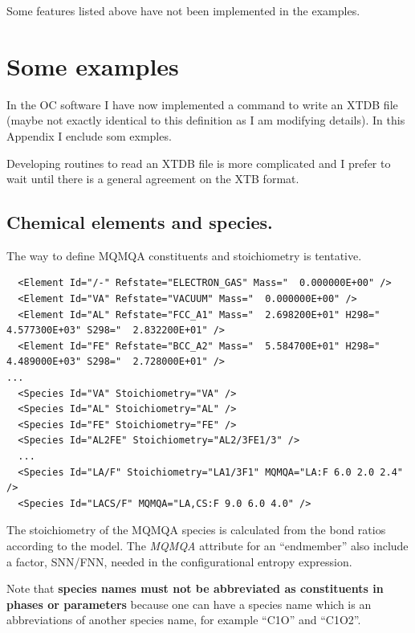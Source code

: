 \documentclass{article}
\begin{document}
\newpage
\begin{appendices}
\setcounter{equation}{0}
\renewcommand{\theequation}{A\arabic{equation}}
\setcounter{figure}{0}
\renewcommand{\thefigure}{A\arabic{figure}}

Some features listed above have not been implemented in the examples.

\section{Some examples}\label{sec:examples}

In the OC software I have now implemented a command to write an XTDB
file (maybe not exactly identical to this definition as I am modifying
details).  In this Appendix I enclude som exmples.

Developing routines to read an XTDB file is more complicated and I
prefer to wait until there is a general agreement on the XTB format.

\subsection{Chemical elements and species.}\label{sec:elementexample}

The way to define MQMQA constituents and stoichiometry is tentative.

{\small
\begin{verbatim}
  <Element Id="/-" Refstate="ELECTRON_GAS" Mass="  0.000000E+00" />
  <Element Id="VA" Refstate="VACUUM" Mass="  0.000000E+00" />
  <Element Id="AL" Refstate="FCC_A1" Mass="  2.698200E+01" H298="  4.577300E+03" S298="  2.832200E+01" />
  <Element Id="FE" Refstate="BCC_A2" Mass="  5.584700E+01" H298="  4.489000E+03" S298="  2.728000E+01" />
...
  <Species Id="VA" Stoichiometry="VA" />
  <Species Id="AL" Stoichiometry="AL" />
  <Species Id="FE" Stoichiometry="FE" />
  <Species Id="AL2FE" Stoichiometry="AL2/3FE1/3" />
  ...
  <Species Id="LA/F" Stoichiometry="LA1/3F1" MQMQA="LA:F 6.0 2.0 2.4" />
  <Species Id="LACS/F" MQMQA="LA,CS:F 9.0 6.0 4.0" />
\end{verbatim}
}

The stoichiometry of the MQMQA species is calculated from the bond
ratios according to the model.  The {\em MQMQA} attribute for an
``endmember'' also include a factor, SNN/FNN, needed in the
configurational entropy expression.

Note that {\bf species names must not be abbreviated as constituents
  in phases or parameters} because one can have a species name which
is an abbreviations of another species name, for example ``C1O'' and
``C1O2''.


\end{appendices}
\end{document}
